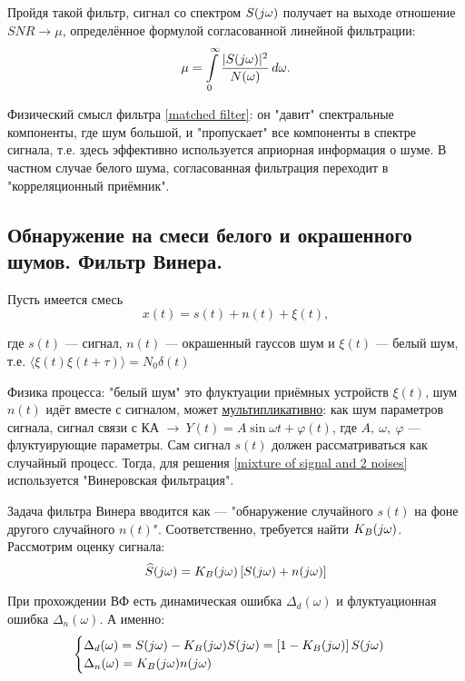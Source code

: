 \documentclass[../main/main.tex]{subfiles}
\begin{document}
Пройдя такой фильтр, сигнал со спектром $S(j\omega)$ получает на выходе отношение $SNR \rightarrow \mu$, определённое формулой согласованной линейной фильтрации: 
\begin{equation}
\label{matched filter}
    \mu = \int\limits_0^\infty \frac{|S(j\omega)|^2}{N(\omega)}\, d\omega.
\end{equation}

Физический смысл фильтра \ref{matched filter}: он "давит"{} спектральные компоненты, где шум большой, и "пропускает"{} все компоненты в спектре сигнала, т.е. здесь эффективно используется априорная информация о шуме. В частном случае белого шума, согласованная фильтрация переходит в "корреляционный приёмник".

\subsection{Обнаружение на смеси белого и окрашенного шумов. Фильтр Винера.}
Пусть имеется смесь 
\begin{equation} \label{mixture of signal and 2 noises}
    x(t) = s(t) + n(t) + \xi(t), 
\end{equation}

где $s(t)$ --- сигнал, $n(t)$ --- окрашенный гауссов шум и $\xi(t)$ --- белый шум, т.е. $\langle \xi(t) \xi(t+\tau) \rangle = N_0 \delta(t)$ %

Физика процесса: "белый шум"{} это флуктуации приёмных устройств $\xi(t)$, шум $n(t)$ идёт вместе с сигналом, может \underline{мультипликативно}: как шум параметров сигнала, сигнал связи с КА $\rightarrow~Y(t) = A\sin{\omega t + \varphi(t)}$, где $A,~\omega,~\varphi$ --- флуктуирующие параметры. Сам сигнал $s(t)$ должен рассматриваться как случайный процесс.  Тогда, для решения \ref{mixture of signal and 2 noises} используется "Винеровская фильтрация".

Задача фильтра Винера вводится как --- "обнаружение случайного $s(t)$ на фоне другого случайного $n(t)$". 
Соответственно, требуется найти $K_B(j\omega)$. Рассмотрим оценку сигнала: 
\begin{equation}
    \widehat{S}(j\omega) = K_B(j\omega) \left[ S(j\omega) + n(j\omega) \right]
\end{equation}

При прохождении ВФ есть динамическая ошибка $\Delta_d(\omega)$ и флуктуационная ошибка $\Delta_n(\omega)$. А именно: 
\begin{equation}
    \begin{cases}
        \Delta_d(\omega) = S(j\omega) - K_B(j\omega) S(j\omega) = \left[ 1 - K_B(j\omega) \right] S(j\omega)\\
        \Delta_n(\omega) = K_B(j\omega) n(j\omega)
    \end{cases}
\end{equation}
\end{document}

